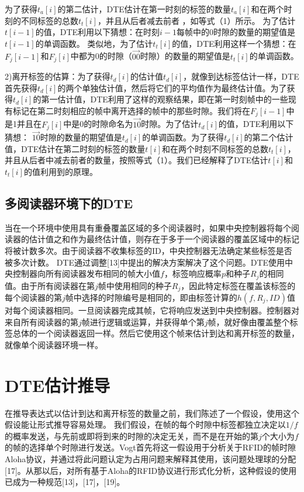 \documentclass[UTF8]{ctexart}
\begin{document}
为了获得$t_a[i]$的第二估计，DTE估计在第一时刻的标签的数量$t_a[i]$和在两个时刻的不同标签的总数$t_t[i]$，并且从后者减去前者 ，如等式（1）所示。 为了估计$t[i-1]$的值，DTE利用以下猜想：在时刻$i-1$每帧中的0时隙的数量的期望值是$t[i-1]$的单调函数。 类似地，为了估计$t_t[i]$的值，DTE利用这样一个猜想：在$F_j[i-1]$和$F_j[i]$中都为0的时隙（$\overrightarrow{00}$时隙）的数量的期望值是$t_t[i]$的单调函数。

2)离开标签的估算：为了获得$t_d[i]$的估计值$t_d[i]$，就像到达标签估计一样，DTE首先获得$t_d[i]$的两个单独估计值，然后将它们的平均值作为最终估计值。为了获得$t_d[i]$的第一估计值，DTE利用了这样的观察结果，即在第一时刻帧中的一些现有标记在第二时刻相应的帧中离开选择的帧中的那些时隙。我们将在$F_j[i-1]$中是1并且在$F_j[i]$中是0的时隙命名为$\overrightarrow{10}$时隙。为了估计$t_d[i]$的值，DTE利用以下猜想： $\overrightarrow{10}$时隙的数量的期望值是$t_d[i]$的单调函数。为了获得$t_d[i]$的第二个估计值，DTE估计在第二时刻的标签的数量$t[i]$和在两个时刻不同标签的总数$t_t[i]$，并且从后者中减去前者的数量，按照等式（1）。我们已经解释了DTE估计$t[i]$和$t_t[i]$的值利用到的原理。

\subsection{多阅读器环境下的DTE}
当在一个环境中使用具有重叠覆盖区域的多个阅读器时，如果中央控制器将每个阅读器的估计值之和作为最终估计值，则存在于多于一个阅读器的覆盖区域中的标记将被计数多次。由于阅读器不收集标签的ID，中央控制器无法确定某些标签是否被多次计数。 DTE通过调整[13]中提出的解决方案解决了这个问题。DTE使用中央控制器向所有阅读器发布相同的帧大小值$f$，标签响应概率$p$和种子$R_j$的相同值。由于所有阅读器在第$j$帧中使用相同的种子$R_j$，因此特定标签在覆盖该标签的每个阅读器的第$j$帧中选择的时隙编号是相同的，即由标签计算的$h(f,R_j,ID)$值对每个阅读器相同。一旦阅读器完成其帧，它将响应发送到中央控制器。控制器对来自所有阅读器的第$j$帧进行逻辑或运算，并获得单个第$j$帧，就好像由覆盖整个标签总体的一个阅读器返回一样。然后它使用这个帧来估计到达和离开标签的数量，就像单个阅读器环境一样。
		
\section{DTE估计推导}
在推导表达式以估计到达和离开标签的数量之前，我们陈述了一个假设，使用这个假设能让形式推导容易处理。 我们假设，在帧的每个时隙中标签都独立决定以$1/f$的概率发送，与先前或即将到来的时隙的决定无关，而不是在开始的第$j$个大小为$f$的帧的选择单个时隙进行发送。Vogt首先将这一假设用于分析关于RFID的帧时隙Aloha协议，并通过将此问题认定为占用问题来解释其使用，该问题处理球的分配[17]。从那以后，对所有基于Aloha的RFID协议进行形式化分析，这种假设的使用已成为一种规范[13]，[17]，[19]。
\end{document}
